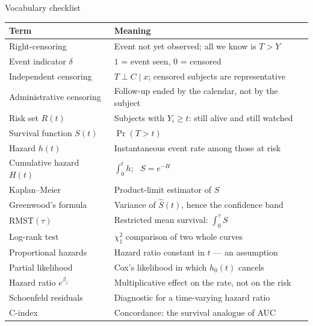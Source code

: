 \documentclass[aspectratio=169,11pt]{beamer}
\begin{document}
\begin{frame}{Vocabulary checklist}
  \scriptsize
  \begin{center}
  \begin{tabular}{@{}ll@{}}
    \toprule
    \textbf{Term} & \textbf{Meaning} \\
    \midrule
    Right-censoring & Event not yet observed; all we know is $T>Y$ \\
    Event indicator $\delta$ & $1$ = event seen, $0$ = censored \\
    Independent censoring & $T\perp C\mid x$; censored subjects are representative \\
    Administrative censoring & Follow-up ended by the calendar, not by the subject \\
    Risk set $R(t)$ & Subjects with $Y_i\ge t$: still alive and still watched \\
    Survival function $S(t)$ & $\Pr(T>t)$ \\
    Hazard $h(t)$ & Instantaneous event rate among those at risk \\
    Cumulative hazard $H(t)$ & $\int_0^t h$; \ $S=e^{-H}$ \\
    Kaplan--Meier & Product-limit estimator of $S$ \\
    Greenwood's formula & Variance of $\hat S(t)$, hence the confidence band \\
    RMST$(\tau)$ & Restricted mean survival: $\int_0^\tau S$ \\
    Log-rank test & $\chi^2_1$ comparison of two whole curves \\
    Proportional hazards & Hazard ratio constant in $t$ --- an assumption \\
    Partial likelihood & Cox's likelihood in which $h_0(t)$ cancels \\
    Hazard ratio $e^{\beta_j}$ & Multiplicative effect on the rate, not on the risk \\
    Schoenfeld residuals & Diagnostic for a time-varying hazard ratio \\
    C-index & Concordance: the survival analogue of AUC \\
    \bottomrule
  \end{tabular}
  \end{center}
\end{frame}
\end{document}
